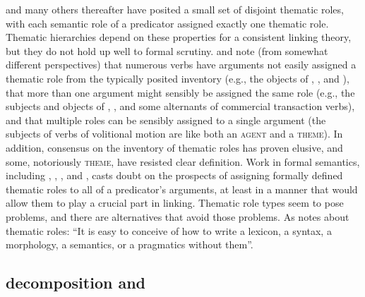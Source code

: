 \documentclass[output=paper
                ,modfonts
                ,nonflat
	        ,collection
	        ,collectionchapter
	        ,collectiontoclongg
 	        ,biblatex
                ,babelshorthands
                ,newtxmath
                ,draftmode
                ,colorlinks, citecolor=brown
]{./langsci/langscibook}
\begin{document}
\citet{Fillmore1968} and many others thereafter have posited a small set of disjoint thematic roles, with each semantic role of a predicator assigned exactly one thematic role.
Thematic hierarchies depend on these properties for a consistent linking theory, but they do not hold up well to formal scrutiny.
\citet{Jackendoff1987} and \citet{Dowty1991} note (from somewhat different perspectives) that numerous verbs have arguments not easily assigned a thematic role from the typically posited inventory (e.g., the objects of , , and ), that more than one argument might sensibly be assigned the same role (e.g., the subjects and objects of , , and some alternants of commercial transaction verbs), and that multiple roles can be sensibly assigned to a single argument (the subjects of verbs of volitional motion are like both an \textsc{agent} and a \textsc{theme}).
In addition, consensus on the inventory of thematic roles has proven elusive, and some, notoriously \textsc{theme}, have resisted clear definition.
Work in formal semantics, including \citet{LadusawandDowty1988}, \citet{Dowty1989}, \citet{Landman2000}, and \cite{Schein2002}, casts doubt on the prospects of assigning formally defined thematic roles to all of a predicator's arguments, at least in a manner that would allow them to play a crucial part in linking.
Thematic role types seem to pose problems, and there are alternatives that avoid those problems.  As \citet{Carlson1998} notes about thematic roles: ``It is easy to conceive of how to write a lexicon, a syntax, a morphology, a semantics, or a pragmatics without them''.

%


\subsection{\content decomposition and \argst}
%
%
%
\end{document}
